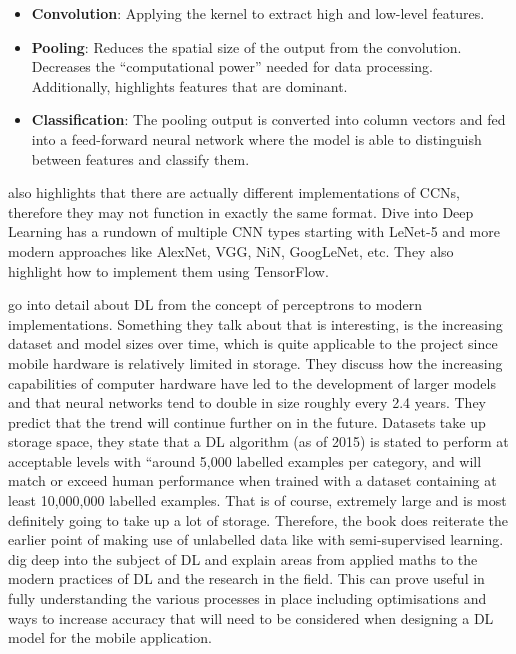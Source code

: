 \documentclass[12pt,a4paper]{report}
\begin{document}
\begin{itemize}
    \item \textbf{Convolution}: Applying the kernel to extract high and low-level features.
    \item \textbf{Pooling}: Reduces the spatial size of the output from the convolution. Decreases the “computational power” 
    needed for data processing. Additionally, highlights features that are dominant.
    \item \textbf{Classification}: The pooling output is converted into column vectors and fed into a feed-forward neural 
    network where the model is able to distinguish between features and classify them.
\end{itemize}

\citet{saha2018} also highlights that there are actually different implementations of CCNs, therefore they may not function 
in exactly the same format. Dive into Deep Learning \citep{diveintodeeplearning} has a rundown of multiple CNN types 
starting with LeNet-5 and more modern approaches like AlexNet, VGG, NiN, GoogLeNet, etc. They also highlight how to 
implement them using TensorFlow.

\par

\citet{goodfellow2016deep} go into detail about DL from the concept of perceptrons to modern 
implementations. Something they talk about that is interesting, is the increasing dataset and model sizes over time, 
which is quite applicable to the project since mobile hardware is relatively limited in storage. They discuss how the 
increasing capabilities of computer hardware have led to the development of larger models and that neural networks tend 
to double in size roughly every 2.4 years. They predict that the trend will continue further on in the future. 
Datasets take up storage space, they state that a DL algorithm 
(as of 2015) is stated to perform at acceptable levels with “around 5,000 labelled examples per category, and will match
or exceed human performance when trained with a dataset containing at least 10,000,000 labelled examples. That is of 
course, extremely large and is most definitely going to take up a lot of storage. Therefore, the book does reiterate 
the earlier point of making use of unlabelled data like with semi-supervised learning. \citet{goodfellow2016deep} 
dig deep into the subject of DL and explain areas from applied maths to the modern practices of DL and 
the research in the field. This can prove useful in fully understanding the various processes in place including 
optimisations and ways to increase accuracy that will need to be considered when designing a DL model for the mobile 
application.
\end{document}
